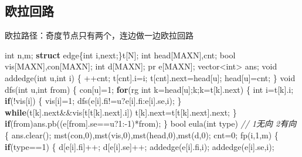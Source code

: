 \documentclass[
]{article}
\newenvironment{Shaded}{}{}
\newcommand{\CommentTok}[1]{\textcolor[rgb]{0.38,0.63,0.69}{\textit{#1}}}
\newcommand{\ControlFlowTok}[1]{\textcolor[rgb]{0.00,0.44,0.13}{\textbf{#1}}}
\newcommand{\DataTypeTok}[1]{\textcolor[rgb]{0.56,0.13,0.00}{#1}}
\newcommand{\DecValTok}[1]{\textcolor[rgb]{0.25,0.63,0.44}{#1}}
\newcommand{\KeywordTok}[1]{\textcolor[rgb]{0.00,0.44,0.13}{\textbf{#1}}}
\newcommand{\NormalTok}[1]{#1}
\begin{document}
\hypertarget{ux6b27ux62c9ux56deux8def}{%
\subsection{欧拉回路}\label{ux6b27ux62c9ux56deux8def}}

欧拉路径：奇度节点只有两个，连边做一边欧拉回路

\begin{Shaded}
\begin{Highlighting}[]
\DataTypeTok{int}\NormalTok{ n,m;}
\KeywordTok{struct}\NormalTok{ edge\{}\DataTypeTok{int}\NormalTok{ i,next;\}t[N];}
\DataTypeTok{int}\NormalTok{ head[MAXN],cnt;}
\DataTypeTok{bool}\NormalTok{ vis[MAXN],con[MAXN];}
\DataTypeTok{int}\NormalTok{ d[MAXN];}
\NormalTok{pr e[MAXN];}
\NormalTok{vector\textless{}}\DataTypeTok{int}\NormalTok{\textgreater{} ans;}
\DataTypeTok{void}\NormalTok{ addedge(}\DataTypeTok{int}\NormalTok{ u,}\DataTypeTok{int}\NormalTok{ i)}
\NormalTok{\{}
\NormalTok{    ++cnt;}
\NormalTok{    t[cnt].i=i;}
\NormalTok{    t[cnt].next=head[u];}
\NormalTok{    head[u]=cnt;}
\NormalTok{\}}
\DataTypeTok{void}\NormalTok{ dfs(}\DataTypeTok{int}\NormalTok{ u,}\DataTypeTok{int}\NormalTok{ from)}
\NormalTok{\{}
\NormalTok{    con[u]=}\DecValTok{1}\NormalTok{;}
    \ControlFlowTok{for}\NormalTok{(rg }\DataTypeTok{int}\NormalTok{ k=head[u];k;k=t[k].next)}
\NormalTok{    \{}
        \DataTypeTok{int}\NormalTok{ i=t[k].i;}
        \ControlFlowTok{if}\NormalTok{(!vis[i])}
\NormalTok{        \{}
\NormalTok{            vis[i]=}\DecValTok{1}\NormalTok{;}
\NormalTok{            dfs(e[i].fi!=u?e[i].fi:e[i].se,i);}
\NormalTok{        \}}
        \ControlFlowTok{while}\NormalTok{(t[k].next\&\&vis[t[t[k].next].i])}
\NormalTok{            t[k].next=t[t[k].next].next;}
\NormalTok{    \}}
    \ControlFlowTok{if}\NormalTok{(from)ans.pb((e[from].se==u?}\DecValTok{1}\NormalTok{:{-}}\DecValTok{1}\NormalTok{)*from);}
\NormalTok{\}}
\DataTypeTok{bool}\NormalTok{ eula(}\DataTypeTok{int}\NormalTok{ type) }\CommentTok{// 1无向 2有向}
\NormalTok{\{}
\NormalTok{    ans.clear();}
\NormalTok{    mst(con,}\DecValTok{0}\NormalTok{),mst(vis,}\DecValTok{0}\NormalTok{),mst(head,}\DecValTok{0}\NormalTok{),mst(d,}\DecValTok{0}\NormalTok{);}
\NormalTok{    cnt=}\DecValTok{0}\NormalTok{;}
\NormalTok{    fp(i,}\DecValTok{1}\NormalTok{,m)}
\NormalTok{    \{}
        \ControlFlowTok{if}\NormalTok{(type==}\DecValTok{1}\NormalTok{)}
\NormalTok{        \{}
\NormalTok{            d[e[i].fi]++;}
\NormalTok{            d[e[i].se]++;}
\NormalTok{            addedge(e[i].fi,i);}
\NormalTok{            addedge(e[i].se,i);}

\end{Highlighting}
\end{Shaded}
\end{document}
